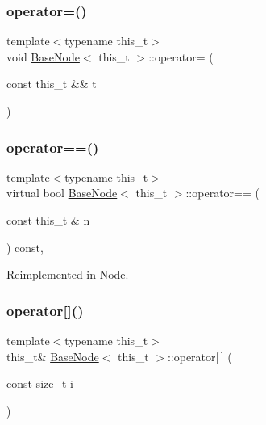 \mbox{\label{class_base_node_adc129f52a6d44237b7e8c62c65f8332c}} 
\subsubsection{\texorpdfstring{operator=()}{operator=()}\hspace{0.1cm}{\footnotesize\ttfamily [2/2]}}
{\footnotesize\ttfamily template$<$typename this\+\_\+t$>$ \\
void \hyperlink{class_base_node}{Base\+Node}$<$ this\+\_\+t $>$\+::operator= (\begin{DoxyParamCaption}\item[{const this\+\_\+t \&\&}]{t }\end{DoxyParamCaption})\hspace{0.3cm}{\ttfamily [inline]}}

\mbox{\label{class_base_node_a33bb5c59122f6b2778d39a0eaa0151d7}} 
\subsubsection{\texorpdfstring{operator==()}{operator==()}}
{\footnotesize\ttfamily template$<$typename this\+\_\+t$>$ \\
virtual bool \hyperlink{class_base_node}{Base\+Node}$<$ this\+\_\+t $>$\+::operator== (\begin{DoxyParamCaption}\item[{const this\+\_\+t \&}]{n }\end{DoxyParamCaption}) const\hspace{0.3cm}{\ttfamily [inline]}, {\ttfamily [virtual]}}



Reimplemented in \hyperlink{class_node_a8f42de356c047dd52472d24ace4d42c5}{Node}.

\mbox{\label{class_base_node_a6aec587267d880a8f87312d90e74af56}} 
\subsubsection{\texorpdfstring{operator[]()}{operator[]()}\hspace{0.1cm}{\footnotesize\ttfamily [1/2]}}
{\footnotesize\ttfamily template$<$typename this\+\_\+t$>$ \\
this\+\_\+t\& \hyperlink{class_base_node}{Base\+Node}$<$ this\+\_\+t $>$\+::operator\mbox{[}$\,$\mbox{]} (\begin{DoxyParamCaption}\item[{const size\+\_\+t}]{i }\end{DoxyParamCaption})\hspace{0.3cm}{\ttfamily [inline]}}

